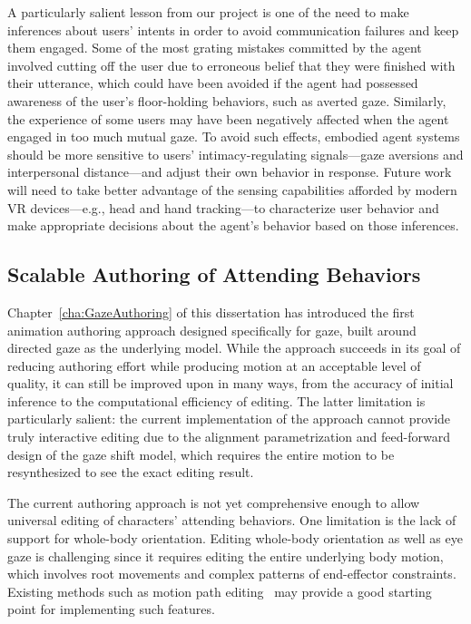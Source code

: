 A particularly salient lesson from our project is one of the need to make inferences about users' intents in order to avoid communication failures and keep them engaged. Some of the most grating mistakes committed by the agent involved cutting off the user due to erroneous belief that they were finished with their utterance, which could have been avoided if the agent had possessed awareness of the user's floor-holding behaviors, such as averted gaze. Similarly, the experience of some users may have been negatively affected when the agent engaged in too much mutual gaze. To avoid such effects, embodied agent systems should be more sensitive to users' intimacy-regulating signals---gaze aversions and interpersonal distance---and adjust their own behavior in response. Future work will need to take better advantage of the sensing capabilities afforded by modern VR devices---e.g., head and hand tracking---to characterize user behavior and make appropriate decisions about the agent's behavior based on those inferences.

\subsection{Scalable Authoring of Attending Behaviors}

Chapter~\ref{cha:GazeAuthoring} of this dissertation has introduced the first animation authoring approach designed specifically for gaze, built around directed gaze as the underlying model. While the approach succeeds in its goal of reducing authoring effort while producing motion at an acceptable level of quality, it can still be improved upon in many ways, from the accuracy of initial inference to the computational efficiency of editing. The latter limitation is particularly salient: the current implementation of the approach cannot provide truly interactive editing due to the alignment parametrization and feed-forward design of the gaze shift model, which requires the entire motion to be resynthesized to see the exact editing result.

The current authoring approach is not yet comprehensive enough to allow universal editing of characters' attending behaviors. One limitation is the lack of support for whole-body orientation. Editing whole-body orientation as well as eye gaze is challenging since it requires editing the entire underlying body motion, which involves root movements and complex patterns of end-effector constraints. Existing methods such as motion path editing~\citep{gleicher2001path} may provide a good starting point for implementing such features.

